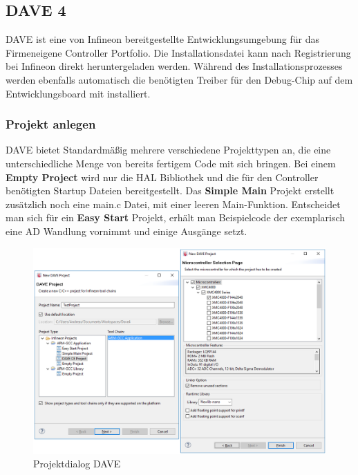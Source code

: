 \subsection{DAVE 4}
DAVE ist eine von Infineon bereitgestellte Entwicklungsumgebung für das Firmeneigene Controller Portfolio. Die Installationsdatei kann nach Registrierung bei Infineon direkt heruntergeladen werden. Während des Installationsprozesses werden ebenfalls automatisch die benötigten Treiber für den Debug-Chip auf dem Entwicklungsboard mit installiert. \\

\subsubsection{Projekt anlegen} 
DAVE bietet Standardm\"a{\ss}ig mehrere verschiedene Projekttypen an, die eine unterschiedliche Menge von bereits fertigem Code mit sich bringen. Bei einem \textbf{Empty Project} wird nur die HAL Bibliothek und die f\"ur den Controller ben\"otigten Startup Dateien bereitgestellt. Das \textbf{Simple Main} Projekt erstellt zus\"atzlich noch eine main.c Datei, mit einer leeren Main-Funktion. Entscheidet man sich für ein \textbf{Easy Start} Projekt, erh\"alt man Beispielcode der exemplarisch eine AD Wandlung vornimmt und einige Ausg\"ange setzt.

\begin{figure}[h]
\centering
\includegraphics[width=\textwidth]{sensor/dave_project.PNG}
\caption{Projektdialog DAVE}
\label{img:dave_project}
\end{figure}

